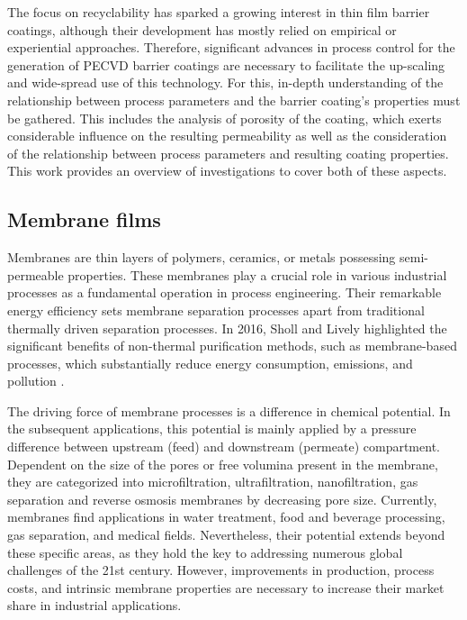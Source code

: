 \documentclass[AMA,STIX2COL]{WileyNJD-v2} %
\begin{document}
The focus on recyclability has sparked a growing interest in thin film barrier coatings, although their development has mostly relied on empirical or experiential approaches. Therefore, significant advances in process control for the generation of PECVD barrier coatings are necessary to facilitate the up-scaling and wide-spread use of this technology. For this, in-depth understanding of the relationship between process parameters and the barrier coating’s properties must be gathered. This includes the analysis of porosity of the coating, which exerts considerable influence on the resulting permeability as well as the consideration of the relationship between process parameters and resulting coating properties. This work provides an overview of investigations to cover both of these aspects.


\subsection{Membrane films}\label{subsec12}



Membranes are thin layers of polymers, ceramics, or metals possessing semi-permeable properties. These membranes play a crucial role in various industrial processes as a fundamental operation in process engineering. Their remarkable energy efficiency sets membrane separation processes apart from traditional thermally driven separation processes. In 2016, Sholl and Lively highlighted the significant benefits of non-thermal purification methods, such as membrane-based processes, which substantially reduce energy consumption, emissions, and pollution \cite{sholl2016seven}.

The driving force of membrane processes is a difference in chemical potential. In the subsequent applications, this potential is mainly applied by a pressure difference between upstream (feed) and downstream (permeate) compartment. Dependent on the size of the pores or free volumina present in the membrane, they are categorized into microfiltration, ultrafiltration, nanofiltration, gas separation and reverse osmosis membranes by decreasing pore size. Currently, membranes find applications in water treatment, food and beverage processing, gas separation, and medical fields. Nevertheless, their potential extends beyond these specific areas, as they hold the key to addressing numerous global challenges of the 21st century. However, improvements in production, process costs, and intrinsic membrane properties are necessary to increase their market share in industrial applications.
\end{document}
